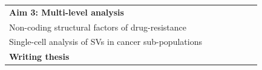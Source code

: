 \documentclass[twoside,fontsize=12pt]{article}
\begin{document}
\begin{table}[h]
\begin{center}
\begin{tabular}{lllllll}
\textbf{Aim 3: Multi-level analysis}            &                                                                                                  &                                                 &  & \cellcolor[HTML]{343434}{\color[HTML]{343434} } & \cellcolor[HTML]{343434}{\color[HTML]{343434} } & \cellcolor[HTML]{343434}{\color[HTML]{343434} } \\
\hspace*{1em} Non-coding structural factors of drug-resistance                                                        &                                                 &                                                 &                        & \cellcolor[HTML]{656565}                  & \cellcolor[HTML]{656565}                     &                    \\
\hspace*{1em} Single-cell analysis of SVs in cancer sub-populations                                                       &                                                 &                                                 &                        &                & \cellcolor[HTML]{656565}                     & \cellcolor[HTML]{656565}                   \\

\textbf{Writing thesis}                         &                                                 &                                                 &                                                 &                                                 &                                                                        & \cellcolor[HTML]{343434}                       
\end{tabular}
\end{center}
\end{table}





%
%
%
%
%
%
%
%
\end{document}

